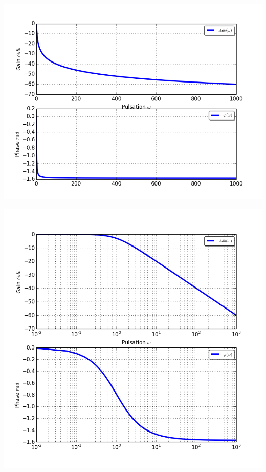 \documentclass[10pt,oneside]{article}
\begin{document}
\begin{minipage}[c]{.48\linewidth}
\begin{center}
\includegraphics[width=\textwidth]{png/bode_orth}
\end{center} 
\end{minipage}\hfill
\begin{minipage}[c]{.48\linewidth}
\begin{center}
\includegraphics[width=\textwidth]{png/bode_semilog}
\end{center}
\end{minipage} 
 
\end{document}
